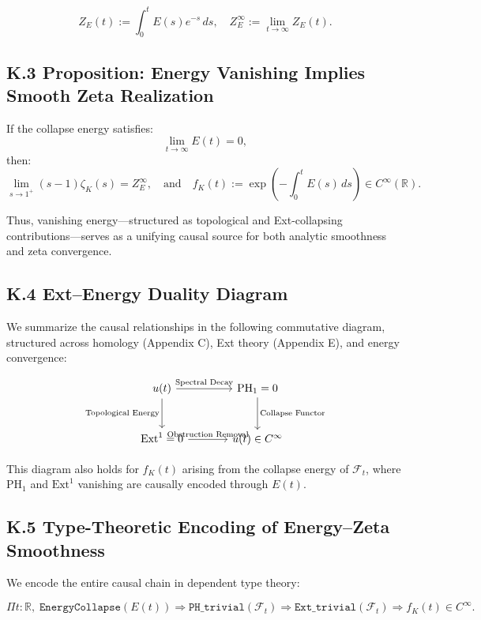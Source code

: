 \documentclass[11pt]{article}
\begin{document}
\[
Z_E(t) := \int_0^t E(s) e^{-s} \, ds,
\quad
Z_E^\infty := \lim_{t \to \infty} Z_E(t).
\]

\subsection*{K.3 Proposition: Energy Vanishing Implies Smooth Zeta Realization}

\begin{proposition}
\label{prop:energy-zeta}
If the collapse energy satisfies:
\[
\lim_{t \to \infty} E(t) = 0,
\]
then:
\[
\lim_{s \to 1^+} (s-1)\zeta_K(s) = Z_E^\infty,
\quad \text{and} \quad f_K(t) := \exp\left(-\int_0^t E(s) \, ds\right) \in C^\infty(\mathbb{R}).
\]
\end{proposition}

\noindent
Thus, vanishing energy—structured as topological and Ext-collapsing contributions—serves as a unifying causal source for both analytic smoothness and zeta convergence.

\subsection*{K.4 Ext–Energy Duality Diagram}

We summarize the causal relationships in the following commutative diagram, structured across homology (Appendix C), Ext theory (Appendix E), and energy convergence:

\[
\begin{tikzcd}[row sep=large, column sep=large]
u(t) \arrow[r, "\text{Spectral Decay}"] \arrow[d, swap, "\text{Topological Energy}"]
& \mathrm{PH}_1 = 0 \arrow[d, "\text{Collapse Functor}"] \\
\mathrm{Ext}^1 = 0 \arrow[r, "\text{Obstruction Removal}"]
& u(t) \in C^\infty
\end{tikzcd}
\]

\noindent
This diagram also holds for $f_K(t)$ arising from the collapse energy of $\mathcal{F}_t$, where $\mathrm{PH}_1$ and $\mathrm{Ext}^1$ vanishing are causally encoded through $E(t)$.

\subsection*{K.5 Type-Theoretic Encoding of Energy–Zeta Smoothness}

We encode the entire causal chain in dependent type theory:

\[
\Pi t : \mathbb{R},\;
\texttt{EnergyCollapse}(E(t)) \Rightarrow \texttt{PH\_trivial}(\mathcal{F}_t) \Rightarrow \texttt{Ext\_trivial}(\mathcal{F}_t) \Rightarrow f_K(t) \in C^\infty.
\]
\end{document}
